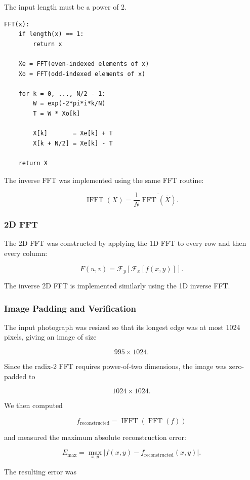 \documentclass[11pt,a4paper]{article}
\begin{document}
The input length must be a power of 2.

\begin{lstlisting}[style=console,caption={Radix-2 1D FFT}]
FFT(x):
    if length(x) == 1:
        return x

    Xe = FFT(even-indexed elements of x)
    Xo = FFT(odd-indexed elements of x)

    for k = 0, ..., N/2 - 1:
        W = exp(-2*pi*i*k/N)
        T = W * Xo[k]

        X[k]       = Xe[k] + T
        X[k + N/2] = Xe[k] - T

    return X
\end{lstlisting}

The inverse FFT was implemented using the same FFT routine:

\[
\operatorname{IFFT}(X)
=
\frac{1}{N}
\overline{\operatorname{FFT}(\overline{X})}.
\]

\subsubsection{2D FFT}

The 2D FFT was constructed by applying the 1D FFT to every row and then every column:

\[
F(u,v)=
\mathcal{F}_y\left[\mathcal{F}_x[f(x,y)]\right].
\]

The inverse 2D FFT is implemented similarly using the 1D inverse FFT.

\subsubsection{Image Padding and Verification}

The input photograph was resized so that its longest edge was at most 1024 pixels, giving an image of size

\[
995\times1024.
\]

Since the radix-2 FFT requires power-of-two dimensions, the image was zero-padded to

\[
1024\times1024.
\]

We then computed

\[
f_{\mathrm{reconstructed}}
=
\operatorname{IFFT}(\operatorname{FFT}(f))
\]

and measured the maximum absolute reconstruction error:

\[
E_{\max}
=
\max_{x,y}
\left|f(x,y)-f_{\mathrm{reconstructed}}(x,y)\right|.
\]

The resulting error was
\end{document}
